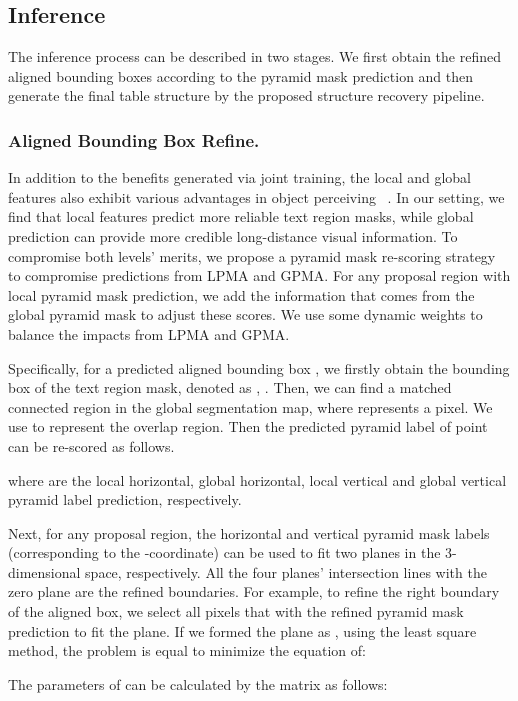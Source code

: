 \documentclass[runningheads]{llncs}
\begin{document}
\subsection{Inference}
The inference process can be described in two stages. We first obtain the refined aligned bounding boxes according to the pyramid mask prediction and then generate the final table structure by the proposed structure recovery pipeline.

\subsubsection{Aligned Bounding Box Refine.}
In addition to the benefits generated via joint training, the local and global features also exhibit various advantages in object perceiving ~\cite{xie2018scene}.  In our setting, we find that local features predict more reliable text region masks, while global prediction can provide more credible long-distance visual information. To compromise both levels' merits, we propose a pyramid mask re-scoring strategy to compromise predictions from LPMA and GPMA. For any proposal region with local pyramid mask prediction, we add the information that comes from the global pyramid mask to adjust these scores. We use some dynamic weights to balance the impacts from LPMA and GPMA.

Specifically, for a predicted aligned bounding box , we firstly obtain the bounding box of the text region mask, denoted as , . Then, we can find a matched connected region  in the global segmentation map, where  represents a pixel. We use  to represent the overlap region. Then the predicted pyramid label of point  can be re-scored as follows.


where  are the local horizontal, global horizontal, local vertical and global vertical pyramid label prediction, respectively.

Next, for any proposal region, the horizontal and vertical pyramid mask labels (corresponding to the -coordinate) can be used to fit two planes in the 3-dimensional space, respectively. All the four planes' intersection lines with the zero plane are the refined boundaries.
For example, to refine the right boundary of the aligned box, we select all pixels that  with the refined pyramid mask prediction  to fit the plane. If we formed the plane as , using the least square method, the problem is equal to minimize the equation of:


The parameters of  can be calculated by the matrix as follows:
\end{document}
